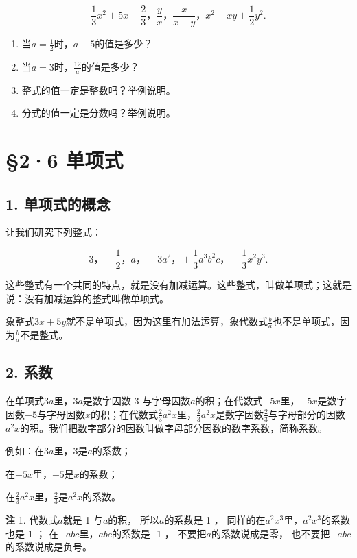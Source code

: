 \[
\frac{1}{3} x ^{2} + 5 x - \frac{2}{3}\text{，} \frac{y}{x}\text{，} \frac{x}{x - y}\text{，} x ^{2} - x y + \frac{1}{2} y ^{2}.
\]

\begin{enumerate}[start=2]
\item
  当\(a = \frac{1}{2}\)时，\(a + 5\)的值是多少？
\item
  当\(a = 3\)时，\(\frac{12}{a}\)的值是多少？
\item
  整式的值一定是整数吗？举例说明。
\item
  分式的值一定是分数吗？举例说明。
\end{enumerate}

\section{§2·6 单项式}

\subsection{1. 单项式的概念}

让我们研究下列整式：

\[
3\text{，} - \frac{1}{2}\text{，} a\text{，} - 3 a ^{2}\text{，} + \frac{1}{3} a ^{3} b ^{2} c\text{，} - \frac{1}{3} x ^{2} y ^{3}.
\]

这些整式有一个共同的特点，就是没有加减运算。这些整式，叫做单项式；这就是说：没有加减运算的整式叫做单项式。

象整式\(3x + 5y\)就不是单项式，因为这里有加法运算，象代数式\(\frac{b}{a}\)也不是单项式，因为\(\frac{b}{a}\)不是整式。

\subsection{2. 系数}

在单项式\(3a\)里，\(3a\)是数字因数 3
与字母因数\(a\)的积；在代数式\(-5x\)里，\(-5x\)是数字因数\(-5\)与字母因数\(x\)的积；在代数式\(\frac{2}{3} a^2 x\)里，\(\frac{2}{3} a^2 x\)是数字因数\(\frac{2}{3}\)与字母部分的因数\(a^2 x\)的积。我们把数字部分的因数叫做字母部分因数的数字系数，简称系数。

例如：在\(3a\)里，3是\(a\)的系数；

在\(-5x\)里，\(-5\)是\(x\)的系数；

在\(\frac{2}{3} a^2 x\)里，\(\frac{2}{3}\)是\(a^2 x\)的系数。

\textbf{注} 1. 代数式\(a\)就是 1 与\(a\)的积， 所以\(a\)的系数是 1 ，
同样的在\(a^2 x^3\)里，\(a^2 x^3\)的系数也是 1 ；
在\(-abc\)里，\(abc\)的系数是 -1 ， 不要把\(a\)的系数说成是零，
也不要把\(-abc\)的系数说成是负号。

